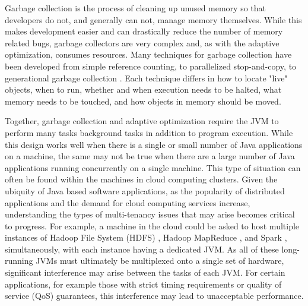 \documentclass{sig-alternate}
\begin{document}
Garbage collection is the process of cleaning up unused memory so that developers do not, and generally can not, manage memory themselves. While this makes development easier and can drastically reduce the number of memory related bugs, garbage collectors are very complex and, as with the adaptive optimization, consumes resources. Many techniques for garbage collection have been developed from simple reference counting, to parallelized stop-and-copy, to generational garbage collection \cite{lins1996garbage}. Each technique differs in how to locate "live" objects, when to run, whether and when execution needs to be halted, what memory needs to be touched, and how objects in memory should be moved.

Together, garbage collection and adaptive optimization require the JVM to perform many tasks background tasks in addition to program execution. While this design works well when there is a single or small number of Java applications on a machine, the same may not be true when there are a large number of Java applications running concurrently on a single machine. This type of situation can often be found within the machines in cloud computing clusters. Given the ubiquity of Java based software applications, as the popularity of distributed applications and the demand for cloud computing services increase, understanding the types of multi-tenancy issues that may arise becomes critical to progress. For example, a machine in the cloud could be asked to host multiple instances of Hadoop File System (HDFS) \cite{shvachko2010hadoop}, Hadoop MapReduce \cite{bialecki2005hadoop}, and Spark \cite{zaharia2010spark}, simultaneously, with each instance having a dedicated JVM. As all of these long-running JVMs must ultimately be multiplexed onto a single set of hardware, significant interference may arise between the tasks of each JVM. For certain applications, for example those with strict timing requirements or quality of service (QoS) guarantees, this interference may lead to unacceptable performance.
\end{document}
